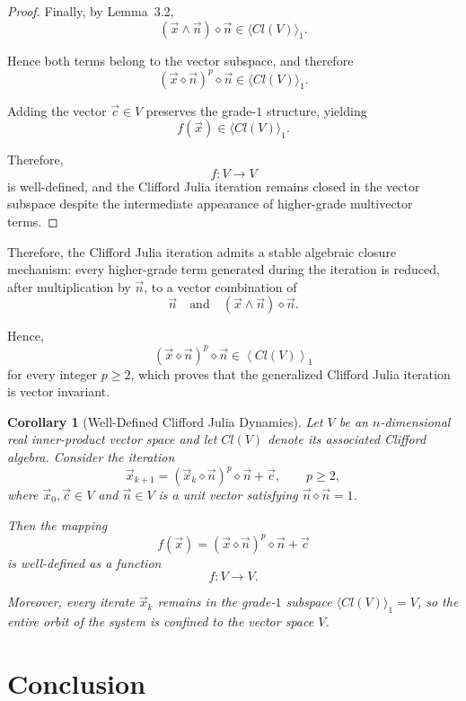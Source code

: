 \documentclass{amsart}
\theoremstyle{plain}
\newtheorem{corollary}{Corollary}
\numberwithin{equation}{section}
\begin{document}
\begin{proof}
Finally, by Lemma~3.2,
\[
(\vec x\wedge\vec n)\diamond\vec n
\in
\langle Cl(V)\rangle_1.
\]

Hence both terms belong to the vector subspace, and therefore
\[
(\vec x\diamond\vec n)^p\diamond\vec n
\in
\langle Cl(V)\rangle_1.
\]

Adding the vector $\vec c\in V$ preserves the grade-$1$
structure, yielding
\[
f(\vec x)\in \langle Cl(V)\rangle_1.
\]

Therefore,
\[
f:V\to V
\]
is well-defined, and the Clifford Julia iteration remains closed
in the vector subspace despite the intermediate appearance of
higher-grade multivector terms.

\end{proof}

Therefore, the Clifford Julia iteration admits a stable algebraic
closure mechanism: every higher-grade term generated during the
iteration is reduced, after multiplication by $\vec n$, to a vector
combination of
\[
\vec n
\quad\text{and}\quad
(\vec x\wedge \vec n)\diamond \vec n.
\]

Hence,
\[
(\vec x\diamond \vec n)^p\diamond \vec n
\in
\left\langle Cl(V)\right\rangle_1
\]
for every integer $p\ge2$, which proves that the generalized Clifford
Julia iteration is vector invariant.



\begin{corollary}[Well-Defined Clifford Julia Dynamics]

Let $V$ be an $n$-dimensional real inner-product vector space and let
$Cl(V)$ denote its associated Clifford algebra. Consider the iteration
\[
\vec{x}_{k+1} = (\vec{x}_k \diamond \vec{n})^p \diamond \vec{n} + \vec{c},
\qquad p\ge2,
\]
where $\vec{x}_0, \vec{c} \in V$ and $\vec{n} \in V$ is a unit vector
satisfying $\vec{n}\diamond\vec{n}=1$.

Then the mapping
\[
f(\vec{x}) = (\vec{x}\diamond \vec{n})^p \diamond \vec{n} + \vec{c}
\]
is well-defined as a function
\[
f: V \to V.
\]

Moreover, every iterate $\vec{x}_k$ remains in the grade-$1$ subspace
$\langle Cl(V)\rangle_1 = V$, so the entire orbit of the system is
confined to the vector space $V$.

\end{corollary}


\section{Conclusion}
\end{document}
